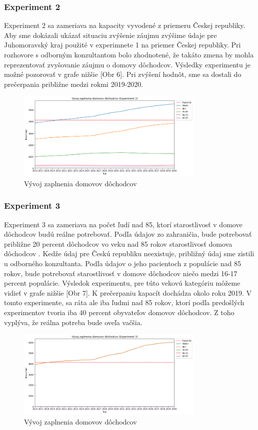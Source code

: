 \documentclass[a4paper, 11pt]{article}
\begin{document}
\subsubsection{Experiment 2}
Experiment 2 sa zameriava na kapacity vyvodené z priemeru Českej republiky. Aby sme dokázali ukázať situaciu zvýšenie záujmu zvýšime údaje pre Juhomoravský kraj použité v experimnete 1 na priemer Českej republiky. Pri rozhovore s odborným konzultantom bolo zhodnotené, že takáto zmena by mohla reprezentovať zvyšovanie záujmu o domovy dôchodcov. Výsledky experimentu je možné pozorovať v grafe nižšie [Obr 6]. Pri zvýšení hodnôt, sme sa dostali do prečerpania približne medzi rokmi 2019-2020.
\begin{figure}[H]
\centering
\includegraphics[width=0.8\textwidth]{exp_5}
\caption{Vývoj zaplnenia domovov dôchodcov}
\end{figure}

\subsubsection{Experiment 3}
Experiment 3 sa zameriava na počet ľudí nad 85, ktorí starostlivosť v domove dôchodcov budú reálne potrebovať. Podľa údajov zo zahraničia, bude potrebovať približne 20 percent dôchodcov vo veku nad 85 rokov starostlivosť domova dôchodcov \cite{amerika}. Kedže údaj pre Českú republiku neexistuje, približný údaj sme zistili u odborného konzultanta. Podľa údajov o jeho pacientoch z populácie nad 85 rokov, bude potrebovať starostlivosť v domove dôchodcov niečo medzi 16-17 percent populácie. Výsledok experimentu, pre túto vekovú kategóriu môžeme vidieť v grafe nižšie [Obr 7]. K prečerpaniu kapacít dochádza okolo roku 2019. V tomto experimente, sa ráta ale iba ľudmi nad 85 rokov, ktorí podľa predošlých experimentov tvoria iba 40 percent obyvateľov domovov dôchodcov. Z toho vyplýva, že reálna potreba bude oveľa vačšia.
\begin{figure}[H]
\centering
\includegraphics[width=0.8\textwidth]{exp_6}
\caption{Vývoj zaplnenia domovov dôchodcov}
\end{figure}
\end{document}
